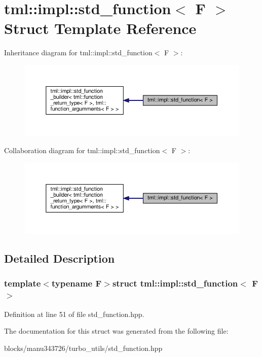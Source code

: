 \hypertarget{structtml_1_1impl_1_1std__function}{\section{tml\+:\+:impl\+:\+:std\+\_\+function$<$ F $>$ Struct Template Reference}
\label{structtml_1_1impl_1_1std__function}
}


Inheritance diagram for tml\+:\+:impl\+:\+:std\+\_\+function$<$ F $>$\+:
\nopagebreak
\begin{figure}[H]
\begin{center}
\leavevmode
\includegraphics[width=350pt]{structtml_1_1impl_1_1std__function__inherit__graph}
\end{center}
\end{figure}


Collaboration diagram for tml\+:\+:impl\+:\+:std\+\_\+function$<$ F $>$\+:
\nopagebreak
\begin{figure}[H]
\begin{center}
\leavevmode
\includegraphics[width=350pt]{structtml_1_1impl_1_1std__function__coll__graph}
\end{center}
\end{figure}


\subsection{Detailed Description}
\subsubsection*{template$<$typename F$>$struct tml\+::impl\+::std\+\_\+function$<$ F $>$}



Definition at line 51 of file std\+\_\+function.\+hpp.



The documentation for this struct was generated from the following file\+:\begin{DoxyCompactItemize}
\item 
blocks/manu343726/turbo\+\_\+utils/std\+\_\+function.\+hpp\end{DoxyCompactItemize}
